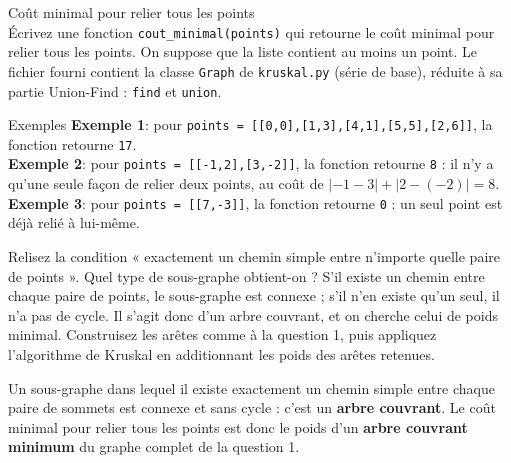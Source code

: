 \begin{Exercice}[25 minutes] [Python] Coût minimal pour relier tous les points\\

    Écrivez une fonction \lstinline{cout_minimal(points)} qui retourne le coût minimal pour relier tous les points. On suppose que la liste contient au moins un point. Le fichier fourni contient la classe \lstinline{Graph} de \lstinline{kruskal.py} (série de base), réduite à sa partie Union-Find : \lstinline{find} et \lstinline{union}.\\

    \begin{Example}{\faTerminal \quad Exemples}
        \textbf{Exemple 1}\!: pour \lstinline{points = [[0,0],[1,3],[4,1],[5,5],[2,6]]}, la fonction retourne \lstinline{17}.\\

        \textbf{Exemple 2}\!: pour \lstinline{points = [[-1,2],[3,-2]]}, la fonction retourne \lstinline{8} : il n'y a qu'une seule façon de relier deux points, au coût de $|-1-3| + |2-(-2)| = 8$.\\

        \textbf{Exemple 3}\!: pour \lstinline{points = [[7,-3]]}, la fonction retourne \lstinline{0} : un seul point est déjà relié à lui-même.
    \end{Example}

    

    \begin{conseil}
        Relisez la condition « exactement un chemin simple entre n'importe quelle paire de points ». Quel type de sous-graphe obtient-on ? S'il existe un chemin entre chaque paire de points, le sous-graphe est connexe ; s'il n'en existe qu'un seul, il n'a pas de cycle. Il s'agit donc d'un arbre couvrant, et on cherche celui de poids minimal. Construisez les arêtes comme à la question 1, puis appliquez l'algorithme de Kruskal en additionnant les poids des arêtes retenues.
    \end{conseil}

    \begin{solution}
        Un sous-graphe dans lequel il existe exactement un chemin simple entre chaque paire de sommets est connexe et sans cycle : c'est un \textbf{arbre couvrant}. Le coût minimal pour relier tous les points est donc le poids d'un \textbf{arbre couvrant minimum} du graphe complet de la question 1.


\end{solution}
\end{Exercice}
